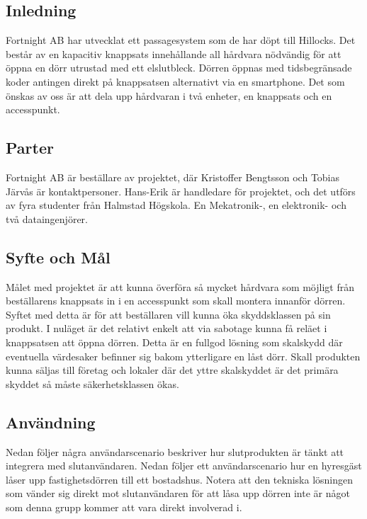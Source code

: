 \documentclass{article}
\begin{document}
\newpage
\renewcommand{\cftsecleader}{\cftdotfill{\cftdotsep}}
\tableofcontents
\newpage
\begin{multicols*}{2}
\section{Inledning}
Fortnight AB har utvecklat ett passagesystem som de har döpt till Hillocks. Det består av en kapacitiv knappsats innehållande all hårdvara nödvändig för att öppna en dörr utrustad med ett elslutbleck. Dörren öppnas med tidsbegränsade koder antingen direkt på knappsatsen alternativt via en smartphone. Det som önskas av oss är att dela upp hårdvaran i två enheter, en knappsats och en accesspunkt.

\subsection{Parter}
Fortnight AB är beställare av projektet, där Kristoffer Bengtsson och Tobias Järvås är kontaktpersoner. Hans-Erik är handledare för projektet, och det utförs av fyra studenter från Halmstad Högskola. En Mekatronik-, en elektronik- och två dataingenjörer.

\subsection{Syfte och Mål}
Målet med projektet är att kunna överföra så mycket hårdvara som möjligt från beställarens knappsats in i en accesspunkt som skall montera innanför dörren. Syftet med detta är för att beställaren vill kunna öka skyddsklassen på sin produkt. I nuläget är det relativt enkelt att via sabotage kunna få reläet i knappsatsen att öppna dörren. Detta är en fullgod lösning som skalskydd där eventuella värdesaker befinner sig bakom ytterligare en låst dörr. Skall produkten kunna säljas till företag och lokaler där det yttre skalskyddet är det primära skyddet så måste säkerhetsklassen ökas.

\subsection{Användning}
Nedan följer några användarscenario beskriver hur slutprodukten är tänkt att integrera med slutanvändaren. Nedan följer ett användarscenario hur en hyresgäst låser upp fastighetsdörren till ett bostadshus. Notera att den tekniska lösningen som vänder sig direkt mot slutanvändaren för att låsa upp dörren inte är något som denna grupp kommer att vara direkt involverad i.


\end{multicols*}
\end{document}
